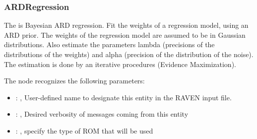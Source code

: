 \subsubsection{ARDRegression}
  The  is Bayesian ARD regression.                             Fit the
  weights of a regression model, using an ARD prior. The weights of the
  regression model are assumed to be in Gaussian distributions. Also estimate the
  parameters lambda (precisions of the distributions of the weights) and
  alpha (precision of the distribution of the noise).                             The estimation is
  done by an iterative procedures (Evidence Maximization).

  The  node recognizes the following parameters:
    \begin{itemize}
      \item {}: , 
        User-defined name to designate this entity in the RAVEN input file.
      \item {}: , 
        Desired verbosity of messages coming from this entity
      \item {}: , 
        specify the type of ROM that will be used
  \end{itemize}

